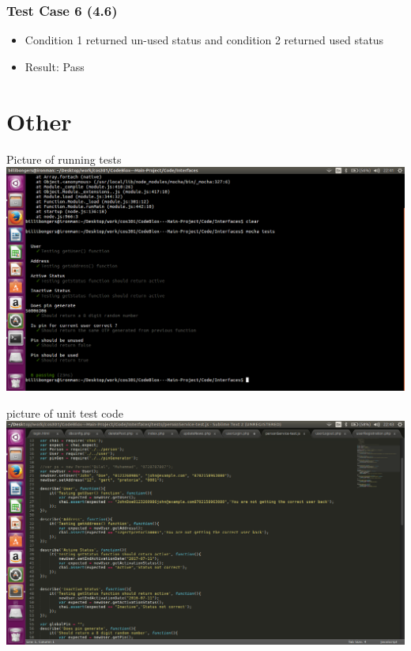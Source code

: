 \documentclass[a4paper,12pt]{article}
\begin{document}
			\subsubsection{Test Case 6 (4.6)}
			\begin{itemize}
				\item Condition 1 returned un-used status and condition 2 returned used status
				\item 	Result: Pass
			\end{itemize}

	\section{Other}
	Picture of running tests \newline
				\includegraphics[width=1\textwidth]{./Pictures/1.png}\\[1.5cm] \newline
				
	picture of unit test code \newline
				\includegraphics[width=1\textwidth]{./Pictures/2.png}\\[1.5cm] \newline
				
\end{document}
